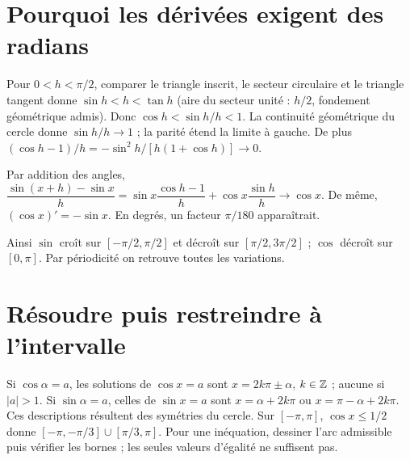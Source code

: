 \documentclass[../cours_tle.tex]{subfiles}
\begin{document}
\section{Pourquoi les dérivées exigent des radians}
Pour $0<h<\pi/2$, comparer le triangle inscrit, le secteur circulaire et le triangle tangent donne $\sin h<h<\tan h$ (aire du secteur unité : $h/2$, fondement géométrique admis).
Donc $\cos h<\sin h/h<1$. La continuité géométrique du cercle donne $\sin h/h\to1$ ; la parité étend la limite à gauche.
De plus $(\cos h-1)/h=-\sin^2h/[h(1+\cos h)]\to0$.
\begin{demonstration}[Dérivées]
Par addition des angles,
$\dfrac{\sin(x+h)-\sin x}{h}=\sin x\dfrac{\cos h-1}{h}+\cos x\dfrac{\sin h}{h}\to\cos x$.
De même, $(\cos x)'=-\sin x$. En degrés, un facteur $\pi/180$ apparaîtrait.
\end{demonstration}
Ainsi $\sin$ croît sur $[-\pi/2,\pi/2]$ et décroît sur $[\pi/2,3\pi/2]$ ; $\cos$ décroît sur $[0,\pi]$. Par périodicité on retrouve toutes les variations.
\begin{center}
\end{center}
\section{Résoudre puis restreindre à l'intervalle}
Si $\cos\alpha=a$, les solutions de $\cos x=a$ sont $x=2k\pi\pm\alpha$, $k\in\mathbb{Z}$ ; aucune si $|a|>1$.
Si $\sin\alpha=a$, celles de $\sin x=a$ sont $x=\alpha+2k\pi$ ou $x=\pi-\alpha+2k\pi$.
Ces descriptions résultent des symétries du cercle.
Sur $[-\pi,\pi]$, $\cos x\le1/2$ donne $[-\pi,-\pi/3]\cup[\pi/3,\pi]$.
Pour une inéquation, dessiner l'arc admissible puis vérifier les bornes ; les seules valeurs d'égalité ne suffisent pas.
\end{document}
